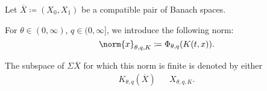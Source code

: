 \begin{definition}\label{def:k_functional_interpolation_space}
  Let \( \overline{X} \coloneqq ( X_0, X_1 ) \) be a compatible pair of Banach spaces.

  For \( \theta \in (0, \infty) \), \( q \in (0, \infty] \), we introduce the following norm:
  \begin{equation}\label{eq:def:k_functional_interpolation_space/norm}
    \norm{x}_{\theta,q,K} \coloneqq \Phi_{\theta,q}(K(t, x)).
  \end{equation}

  The subspace of \( \Sigma\overline{X} \) for which this norm is finite is denoted by either
  \begin{align*}
    K_{\theta,q}(\overline{X})
    &&
    X_{\theta,q,K}.
  \end{align*}
\end{definition}

